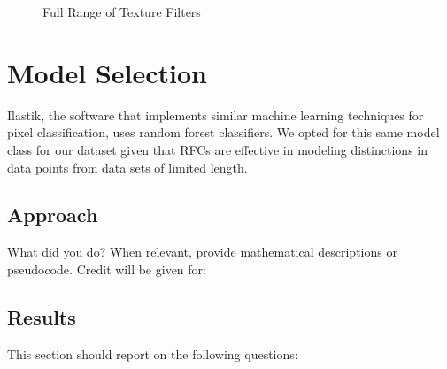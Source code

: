 \documentclass[11pt]{article}
\begin{document}
\begin{figure}[H]
{{{            }
        }\hfill{
        }
    }\caption{Full Range of Texture Filters}
    \label{fig:texture}
\end{figure}


\section{Model Selection}

Ilastik, the software that implements similar machine learning techniques for pixel classification,
uses random forest classifiers. We opted for this same model class for our dataset given that RFCs
are effective in modeling distinctions in data points from data sets of limited length.

\subsection{Approach}

What did you do? When relevant, provide mathematical descriptions or pseudocode. Credit will be
given for:

\subsection{Results}

This section should report on the following questions: 
\end{document}
